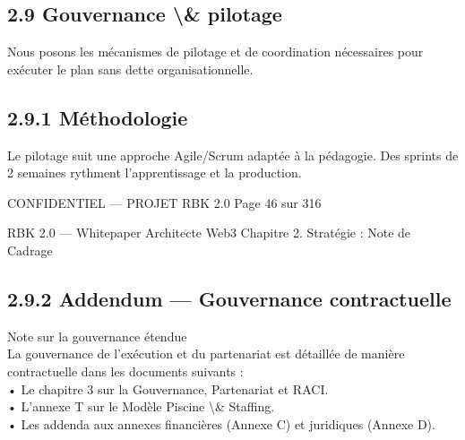\subsection{2.9 Gouvernance \textbackslash{}& pilotage}
Nous posons les mécanismes de pilotage et de coordination nécessaires pour exécuter le plan sans dette organisationnelle.\\
\vspace{0.5em}
\vspace{0.5em}
\subsection{2.9.1 Méthodologie}
Le pilotage suit une approche Agile/Scrum adaptée à la pédagogie. Des sprints de 2 semaines rythment l’apprentissage et la production.\\
\vspace{0.5em}
\vspace{0.5em}
\vspace{0.5em}
\vspace{0.5em}
\begin{confidential}CONFIDENTIEL — PROJET RBK 2.0                                            Page 46 sur 316\end{confidential}
RBK 2.0 — Whitepaper Architecte Web3                                                                                      Chapitre 2. Stratégie : Note de Cadrage\\
\vspace{0.5em}
\vspace{0.5em}
\subsection{2.9.2 Addendum — Gouvernance contractuelle}
\vspace{0.5em}
Note sur la gouvernance étendue\\
\vspace{0.5em}
La gouvernance de l’exécution et du partenariat est détaillée de manière contractuelle dans les documents suivants :\\
• Le chapitre 3 sur la Gouvernance, Partenariat et RACI.\\
• L’annexe T sur le Modèle Piscine \textbackslash{}& Staffing.\\
• Les addenda aux annexes financières (Annexe C) et juridiques (Annexe D).\\
\vspace{0.5em}
\vspace{0.5em}
\vspace{0.5em}
\vspace{0.5em}
